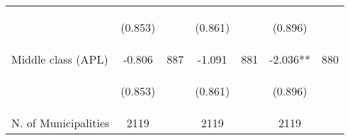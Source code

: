 \begin{tabular}{lcccccc}
\vspace{4pt} &  \begin{footnotesize}(0.853)\end{footnotesize}   & &
			    \begin{footnotesize}(0.861)\end{footnotesize}   & &
			    \begin{footnotesize}(0.896)\end{footnotesize}   &
			     \\

Middle class (APL)  &  -0.806   &  887  &   -1.091  &  881 &  -2.036**  &  880   \\


\vspace{4pt} &  \begin{footnotesize}(0.853)\end{footnotesize}   & &
			    \begin{footnotesize}(0.861)\end{footnotesize}   & &
			    \begin{footnotesize}(0.896)\end{footnotesize}   &
			     \\

N. of Municipalities   &   2119   & &    2119 &    &  2119  &   \\
\hline	


\end{tabular}%
